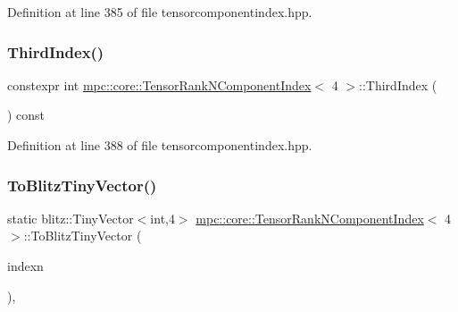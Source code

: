 Definition at line 385 of file tensorcomponentindex.\+hpp.

\mbox{\label{classmpc_1_1core_1_1_tensor_rank_n_component_index_3_014_01_4_ab6e0fb58d5cdb85ea6fd93ff8e9c5ea0}} 
\subsubsection{\texorpdfstring{Third\+Index()}{ThirdIndex()}}
{\footnotesize\ttfamily constexpr int \mbox{\hyperlink{classmpc_1_1core_1_1_tensor_rank_n_component_index}{mpc\+::core\+::\+Tensor\+Rank\+N\+Component\+Index}}$<$ 4 $>$\+::Third\+Index (\begin{DoxyParamCaption}{ }\end{DoxyParamCaption}) const\hspace{0.3cm}{\ttfamily [inline]}}



Definition at line 388 of file tensorcomponentindex.\+hpp.

\mbox{\label{classmpc_1_1core_1_1_tensor_rank_n_component_index_3_014_01_4_a9077a731652e4c75813a7fc77c048a92}} 
\subsubsection{\texorpdfstring{To\+Blitz\+Tiny\+Vector()}{ToBlitzTinyVector()}}
{\footnotesize\ttfamily static blitz\+::\+Tiny\+Vector$<$int,4$>$ \mbox{\hyperlink{classmpc_1_1core_1_1_tensor_rank_n_component_index}{mpc\+::core\+::\+Tensor\+Rank\+N\+Component\+Index}}$<$ 4 $>$\+::To\+Blitz\+Tiny\+Vector (\begin{DoxyParamCaption}\item[{const \mbox{\hyperlink{classmpc_1_1core_1_1_tensor_rank_n_component_index}{mpc\+::core\+::\+Tensor\+Rank\+N\+Component\+Index}}$<$ 4 $>$ \&}]{indexn }\end{DoxyParamCaption})\hspace{0.3cm}{\ttfamily [inline]}, {\ttfamily [static]}}



